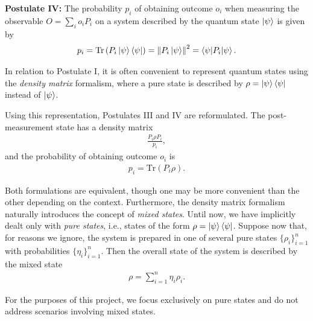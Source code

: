 \documentclass[12pt,letterpaper]{article}
\begin{document}
\textbf{Postulate IV:} The probability $p_i$ of obtaining outcome $o_i$ when measuring the observable $O = \sum_{i} o_i P_i$ on a system described by the quantum state $\ket{\psi}$ is given by
\begin{align*}
	p_i = \text{Tr}\left(P_i \ket{\psi}\bra{\psi}\right) = \left\|P_i\ket{\psi}\right\|^2 = \braket{\psi|P_i|\psi}.
\end{align*}


In relation to Postulate I, it is often convenient to represent quantum states using the \emph{density matrix} formalism, where a pure  state is described by $\rho = \ket{\psi}\bra{\psi}$ instead of $\ket{\psi}$. 


Using this representation, Postulates III and IV are reformulated. The post-measurement state has a density matrix
\begin{align*}
	\frac{P_i \rho P_i}{p_i},
\end{align*}
and the probability of obtaining outcome $o_i$ is
\begin{align*}
	p_i = \text{Tr}(P_i \rho).
\end{align*}

Both formulations are equivalent, though one may be more convenient than the other depending on the context. Furthermore, the density matrix formalism naturally introduces the concept of \emph{mixed states}. Until now, we have implicitly dealt only with \emph{pure states}, i.e., states of the form $\rho = \ket{\psi}\bra{\psi}$. Suppose now that, for reasons we ignore, the system is prepared in one of several pure states $\{\rho_i\}_{i=1}^n$ with probabilities $\{\eta_i\}_{i=1}^n$. Then the overall state of the system is described by the mixed state
\begin{align*}
	\rho = \sum_{i=1}^n \eta_i \rho_i.
\end{align*}

For the purposes of this project, we focus exclusively on pure states and do not address scenarios involving mixed states.
\end{document}
